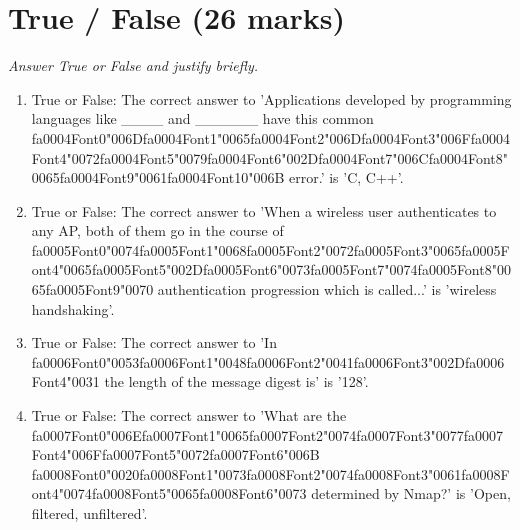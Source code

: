 \documentclass[12pt]{article}
\begin{document}
\section*{True / False (26 marks)}
\textit{Answer True or False and justify briefly.}
\begin{enumerate}[label=\arabic*.]
\item True or False: The correct answer to 'Applications developed by programming languages like \_\_\_\_ and \_\_\_\_\_\_ have this common {\csname fa0004Font0\endcsname\char"006D}{\csname fa0004Font1\endcsname\char"0065}{\csname fa0004Font2\endcsname\char"006D}{\csname fa0004Font3\endcsname\char"006F}{\csname fa0004Font4\endcsname\char"0072}{\csname fa0004Font5\endcsname\char"0079}{\csname fa0004Font6\endcsname\char"002D}{\csname fa0004Font7\endcsname\char"006C}{\csname fa0004Font8\endcsname\char"0065}{\csname fa0004Font9\endcsname\char"0061}{\csname fa0004Font10\endcsname\char"006B} error.' is 'C, C++'.
\item True or False: The correct answer to 'When a wireless user authenticates to any AP, both of them go in the course of {\csname fa0005Font0\endcsname\char"0074}{\csname fa0005Font1\endcsname\char"0068}{\csname fa0005Font2\endcsname\char"0072}{\csname fa0005Font3\endcsname\char"0065}{\csname fa0005Font4\endcsname\char"0065}{\csname fa0005Font5\endcsname\char"002D}{\csname fa0005Font6\endcsname\char"0073}{\csname fa0005Font7\endcsname\char"0074}{\csname fa0005Font8\endcsname\char"0065}{\csname fa0005Font9\endcsname\char"0070} authentication progression which is called...' is 'wireless handshaking'.
\item True or False: The correct answer to 'In {\csname fa0006Font0\endcsname\char"0053}{\csname fa0006Font1\endcsname\char"0048}{\csname fa0006Font2\endcsname\char"0041}{\csname fa0006Font3\endcsname\char"002D}{\csname fa0006Font4\endcsname\char"0031} the length of the message digest is' is '128'.
\item True or False: The correct answer to 'What are the {\csname fa0007Font0\endcsname\char"006E}{\csname fa0007Font1\endcsname\char"0065}{\csname fa0007Font2\endcsname\char"0074}{\csname fa0007Font3\endcsname\char"0077}{\csname fa0007Font4\endcsname\char"006F}{\csname fa0007Font5\endcsname\char"0072}{\csname fa0007Font6\endcsname\char"006B} {\csname fa0008Font0\endcsname\char"0020}{\csname fa0008Font1\endcsname\char"0073}{\csname fa0008Font2\endcsname\char"0074}{\csname fa0008Font3\endcsname\char"0061}{\csname fa0008Font4\endcsname\char"0074}{\csname fa0008Font5\endcsname\char"0065}{\csname fa0008Font6\endcsname\char"0073} determined by Nmap?' is 'Open, filtered, unfiltered'.

\end{enumerate}
\end{document}
